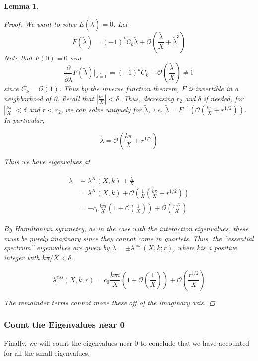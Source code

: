 \documentclass[12pt]{article}
\newtheorem{lemma}{Lemma}
\begin{document}
\begin{lemma}
\begin{proof}
We want to solve $E(\tilde{\lambda}) = 0$. Let
\[
F(\tilde{\lambda}) = (-1)^k C_k \tilde{\lambda} + \mathcal{O}\left( \frac{\tilde{\lambda}}{X} + \tilde{\lambda}^3 \right)
\]
Note that $F(0) = 0$ and 
\[
\frac{\partial}{\partial\tilde{\lambda}}F(\tilde{\lambda})\big|_{\tilde{\lambda = 0}}
= (-1)^k C_k + \mathcal{O}\left( \frac{\tilde{\lambda}}{X} \right) \neq 0
\]
since $C_k = \mathcal{O}(1)$. Thus by the inverse function theorem, $F$ is invertible in a neighborhood of 0. Recall that  $|\frac{k \pi}{X}| < \delta$. Thus, decreasing $r_2$ and $\delta$ if needed, for $|\frac{k\pi}{X}| < \delta$ and $r < r_2$, we can solve uniquely for $\tilde{\lambda}$, i.e. $\tilde{\lambda} = F^{-1}(\mathcal{O} \left( \frac{k \pi}{X} + r^{1/2} \right))$. In particular,

\[
\tilde{\lambda} = \mathcal{O}\left( \frac{k \pi}{X} + r^{1/2} \right)
\]

Thus we have eigenvalues at

\begin{align*}
\lambda &= \lambda^K(X,k) + \frac{\tilde{\lambda}}{X} \\
&= \lambda^K(X,k) + \mathcal{O}\left( \frac{1}{X} \left( \frac{k \pi}{X} + r^{1/2} \right) \right)\\
&= -c_0 \frac{k \pi i }{X} \left( 1 + \mathcal{O}\left( \frac{1}{X} \right)\right) + \mathcal{O}\left( \frac{r^{1/2}}{X} \right)
\end{align*}

By Hamiltonian symmetry, as in the case with the interaction eigenvalues, these must be purely imaginary since they cannot come in quartets. Thus, the ``essential spectrum'' eigenvalues are given by $\lambda = \pm \lambda^{ess}(X, k; r)$, where $k$is a positive integer with $k \pi/X < \delta$.

\[
\lambda^{ess}(X, k; r) = c_0 \frac{k \pi i }{X} \left( 1 + \mathcal{O}\left( \frac{1}{X} \right)\right) + \mathcal{O}\left( \frac{r^{1/2}}{X} \right)
\]

The remainder terms cannot move these off of the imaginary axis.

\end{proof}
\end{lemma}

\subsubsection{Count the Eigenvalues near 0}

Finally, we will count the eigenvalues near 0 to conclude that we have accounted for all the small eigenvalues.  
\end{document}
